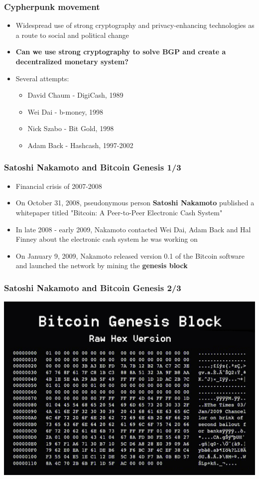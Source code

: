 \documentclass{beamer}
\begin{document}
\begin{frame}
  \frametitle{Cypherpunk movement}
  \begin{itemize}
  \item Widespread use of strong cryptography and privacy-enhancing technologies
    as a route to social and political change
  \item \textbf{Can we use strong cryptography to solve BGP and create a
      decentralized monetary system?}
  \item Several attempts:
    \begin{itemize}
    \item David Chaum - DigiCash, 1989
    \item Wei Dai - b-money, 1998
    \item Nick Szabo - Bit Gold, 1998
    \item Adam Back - Hashcash, 1997-2002
    \end{itemize}
  \end{itemize}
\end{frame}

\begin{frame}
  \frametitle{Satoshi Nakamoto and Bitcoin Genesis 1/3}
  \begin{itemize}
  \item Financial crisis of 2007-2008
  \item On October 31, 2008, pseudonymous person \textbf{Satoshi Nakamoto}
    published a whitepaper titled "Bitcoin: A Peer-to-Peer Electronic Cash
    System"
  \item In late 2008 - early 2009, Nakamoto contacted Wei Dai, Adam Back and Hal
    Finney about the electronic cash system he was working on
  \item On January 9, 2009, Nakamoto released version 0.1 of the Bitcoin
    software and launched the network by mining the \textbf{genesis block}
  \end{itemize}
\end{frame}

\begin{frame}[fragile]
  \frametitle{Satoshi Nakamoto and Bitcoin Genesis 2/3}
  \includegraphics[width=\textwidth]{genesis-block}
\end{frame}
\end{document}
